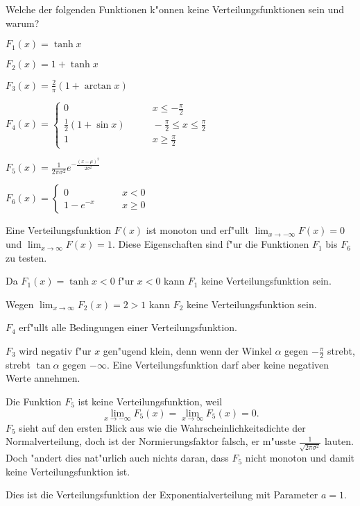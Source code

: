 Welche der folgenden Funktionen k"onnen keine Verteilungsfunktionen sein
und warum?
\begin{teilaufgaben}
\item $F_1(x)=\tanh x$
\item $F_2(x)=1+\tanh x$
\item $F_3(x)=\frac2{\pi}(1+\arctan x)$
\item $F_4(x)=\begin{cases}
0&\qquad x\le -\frac{\pi}2\\
\frac12(1+\sin x)&\qquad-\frac{\pi}2\le x\le \frac{\pi}2\\
1&\qquad x\ge \frac{\pi}2
\end{cases}$
\item $F_5(x)=\frac1{2\pi\sigma^2}e^{-\frac{(x-\mu)^2}{2\sigma^2}}$
\item $F_6(x)=\begin{cases}0&\qquad x<0\\1-e^{-x}&\qquad x\ge 0\end{cases}$
\end{teilaufgaben}

\begin{loesung}
Eine Verteilungsfunktion $F(x)$ ist monoton und erf"ullt
$\lim_{x\to-\infty}F(x)=0$
und
$\lim_{x\to\infty}F(x)=1$. Diese Eigenschaften sind f"ur die
Funktionen $F_1$ bis $F_6$ zu testen.
\begin{teilaufgaben}
\item Da $F_1(x)=\tanh x<0$ f"ur $x<0$ kann $F_1$ keine Verteilungsfunktion sein.
\item Wegen $\lim_{x\to\infty}F_2(x)=2>1$ kann $F_2$ keine Verteilungsfunktion sein.
\item $F_4$ erf"ullt alle Bedingungen einer Verteilungsfunktion.
\item $F_3$ wird negativ f"ur $x$ gen"ugend klein, denn wenn der Winkel
$\alpha$ gegen $-\frac{\pi}2$ strebt, strebt $\tan\alpha$ gegen $-\infty$.
Eine Verteilungsfunktion darf aber keine negativen Werte annehmen.
\item Die Funktion $F_5$ ist keine Verteilungsfunktion, weil
\[
\lim_{x\to-\infty}F_5(x)=\lim_{x\to\infty}F_5(x)=0.
\]
$F_5$ sieht auf den ersten
Blick aus wie die Wahrscheinlichkeitsdichte der Normalverteilung, doch ist
der Normierungsfaktor falsch, er m"usste $\frac1{\sqrt{2\pi\sigma^2}}$ lauten.
Doch "andert dies nat"urlich auch nichts daran, dass $F_5$ nicht monoton und damit
keine Verteilungsfunktion ist.
\item Dies ist die Verteilungsfunktion der Exponentialverteilung mit Parameter $a=1$.
\end{teilaufgaben}
\end{loesung}

